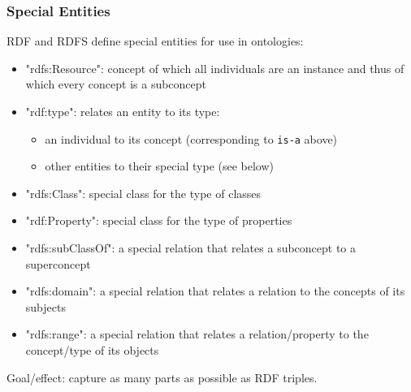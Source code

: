 \begin{frame}\frametitle{Special Entities}
RDF and RDFS define special entities for use in ontologies:
\begin{itemize}
 \item "rdfs:Resource": concept of which all individuals are an instance and thus of which every concept is a subconcept
 \item "rdf:type": relates an entity to its type:
  \begin{itemize}
   \item an individual to its concept (corresponding to \texttt{is-a} above)
   \item other entities to their special type (see below)
  \end{itemize}
 \item "rdfs:Class": special class for the type of classes
 \item "rdf:Property": special class for the type of properties
 \item "rdfs:subClassOf": a special relation that relates a subconcept to a superconcept
 \item "rdfs:domain": a special relation that relates a relation to the concepts of its subjects
 \item "rdfs:range": a special relation that relates a relation/property to the concept/type of its objects
\end{itemize}

Goal/effect: capture as many parts as possible as RDF triples.
\end{frame}

